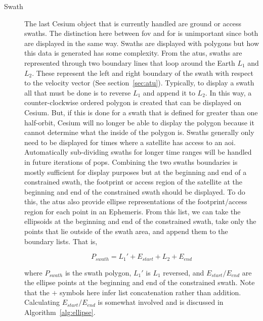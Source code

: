 \begin{description}
    \item[Swath] The last Cesium object that is currently handled are ground or
	access swaths. The distinction here between \gls{fov} and \gls{for} is
	unimportant since both are displayed in the same way. Swaths are
	displayed with polygons but how this data is generated has some
	complexity.  From the \glspl{atu}, swaths are represented through two
	boundary lines that loop around the Earth $L_1$ and $L_2$. These
	represent the left and right boundary of the swath with respect to the
	velocity vector (See section~\ref{sec:atu}).  Typically, to display a
	swath all that must be done is to reverse $L_1$ and append it to $L_2$.
	In this way, a counter-clockwise ordered polygon is created that can be
	displayed on Cesium.  But, if this is done for a swath that is defined
	for greater than one half-orbit, Cesium will no longer be able to
	display the polygon because it cannot determine what the inside of the
	polygon is.  Swaths generally only need to be displayed for times where
	a satellite has access to an \gls{aoi}. Automatically sub-dividing
	swaths for longer time ranges will be handled in future iterations of
	\gls{pops}.  Combining the two swaths boundaries is mostly sufficient
	for display purposes but at the beginning and end of a constrained
	swath, the footprint or access region of the satellite at the beginning
	and end of the constrained swath should be displayed. To do this, the
	\glspl{atu} also provide ellipse representations of the
	footprint/access region for each point in an Ephemeris.  From this
	list, we can take the ellipsoids at the beginning and end of the
	constrained swath, take only the points that lie outside of the swath
	area, and append them to the boundary lists.  That is, 

	\begin{equation*} 
	    P_{swath} = L_1' + E_{start} + L_2 + E_{end} 
	\end{equation*} 

	where $P_{swath}$ is the swath polygon, $L_1'$
	is $L_1$ reversed, and $E_{start}/E_{end}$ are the ellipse points at
	the beginning and end of the constrained swath. Note that the $+$
	symbols here infer list concatenation rather than addition. Calculating
	$E_{start}/E_{end}$ is somewhat involved and is discussed in
	Algorithm~\ref{alg:ellipse}.
	

\end{description}
